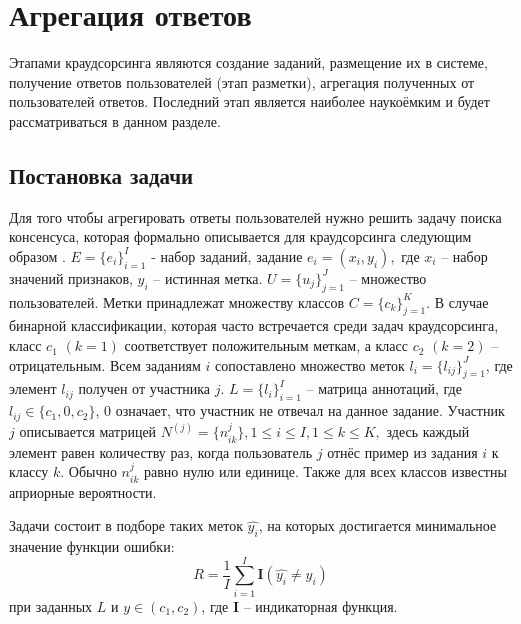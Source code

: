\documentclass[specification,annotation,times]{itmo-student-thesis}
\begin{document}
\startrelatedwork


\section{Агрегация ответов}
Этапами краудсорсинга являются создание заданий, размещение их в системе, получение ответов пользователей (этап разметки), агрегация полученных от пользователей ответов. Последний этап является наиболее наукоёмким и будет рассматриваться в данном разделе.
\subsection{Постановка задачи}
Для того чтобы агрегировать ответы пользователей нужно решить задачу поиска консенсуса, которая формально описывается для краудсорсинга следующим образом \cite{zhang2017consensus}. $E=\{e_{i}\}_{i=1}^{I}$ - набор заданий, задание $e_{i}=(x_{i}, y_{i}),$ где $x_{i}$ -- набор значений признаков, $y_{i}$ -- истинная метка. $U=\{u_{j}\}_{j=1}^{J}$ -- множество пользователей. Метки принадлежат множеству классов $C=\{c_{k}\}_{j=1}^{K}$. В случае бинарной классификации, которая часто встречается среди задач краудсорсинга, класс $c_{1}$ $(k=1)$ соответствует положительным меткам, а класс $c_{2}$ $(k=2)$ -- отрицательным. Всем заданиям $i$ сопоставлено множество меток $l_{i}=\{l_{ij}\}_{j=1}^{J}$, где элемент $l_{ij}$ получен от участника $j$. $L=\{l_{i}\}_{i=1}^{I}$ -- матрица аннотаций, где $l_{ij}\in \{c_{1},0,c_{2}\}$, 0 означает, что участник  не отвечал на данное задание. Участник $j$ описывается матрицей $N^{(j)}=\{n_{ik}^{j}\},1\leq i\leq I,1\leq k\leq K,$ здесь каждый элемент равен количеству раз, когда пользователь $j$ отнёс пример из задания $i$ к классу $k$. Обычно $n_{ik}^{j}$ равно нулю или единице. Также для всех классов известны априорные вероятности.

Задачи состоит в подборе таких меток $\hat{y_{i}}$, на которых достигается минимальное значение функции ошибки:
\[R=\frac{1}{I}\sum_{i=1}^{I}\mathbf{I}(\hat{y_{i}} \neq y_{i})\] 
при заданных $L$ и $y\in (c_{1}, c_{2})$, где $\mathbf{I}$ -- индикаторная функция.
\end{document}
